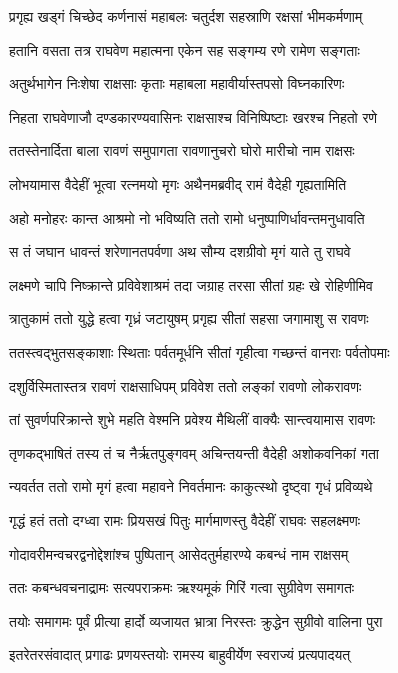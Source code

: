 \twolineshloka
{प्रगृह्य खड्गं चिच्छेद कर्णनासं महाबलः}
{चतुर्दश सहस्राणि रक्षसां भीमकर्मणाम्}

\twolineshloka
{हतानि वसता तत्र राघवेण महात्मना}
{एकेन सह सङ्गम्य रणे रामेण सङ्गताः}

\twolineshloka
{अतुर्थभागेन निःशेषा राक्षसाः कृताः}
{महाबला महावीर्यास्तपसो विघ्नकारिणः}

\twolineshloka
{निहता राघवेणाजौ दण्डकारण्यवासिनः}
{राक्षसाश्च विनिष्पिष्टाः खरश्च निहतो रणे}

\twolineshloka
{ततस्तेनार्दिता बाला रावणं समुपागता}
{रावणानुचरो घोरो मारीचो नाम राक्षसः}

\twolineshloka
{लोभयामास वैदेहीं भूत्वा रत्नमयो मृगः}
{अथैनमब्रवीद् रामं वैदेही गृह्यतामिति}

\twolineshloka
{अहो मनोहरः कान्त आश्रमो नो भविष्यति}
{ततो रामो धनुष्पाणिर्धावन्तमनुधावति}

\twolineshloka
{स तं जघान धावन्तं शरेणानतपर्वणा}
{अथ सौम्य दशग्रीवो मृगं याते तु राघवे}

\twolineshloka
{लक्ष्मणे चापि निष्क्रान्ते प्रविवेशाश्रमं तदा}
{जग्राह तरसा सीतां ग्रहः खे रोहिणीमिव}

\twolineshloka
{त्रातुकामं ततो युद्धे हत्वा गृध्रं जटायुषम्}
{प्रगृह्य सीतां सहसा जगामाशु स रावणः}

\twolineshloka
{ततस्त्वद्भुतसङ्काशाः स्थिताः पर्वतमूर्धनि}
{सीतां गृहीत्वा गच्छन्तं वानराः पर्वतोपमाः}

\twolineshloka
{दशुर्विस्मितास्तत्र रावणं राक्षसाधिपम्}
{प्रविवेश ततो लङ्कां रावणो लोकरावणः}

\twolineshloka
{तां सुवर्णपरिक्रान्ते शुभे महति वेश्मनि}
{प्रवेश्य मैथिलीं वाक्यैः सान्त्वयामास रावणः}

\twolineshloka
{तृणकद्भाषितं तस्य तं च नैर्ऋतपुङ्गवम्}
{अचिन्तयन्ती वैदेही अशोकवनिकां गता}

\twolineshloka
{न्यवर्तत ततो रामो मृगं हत्वा महावने}
{निवर्तमानः काकुत्स्थो दृष्ट्वा गृधं प्रविव्यथे}

\twolineshloka
{गृद्धं हतं ततो दग्ध्वा रामः प्रियसखं पितुः}
{मार्गमाणस्तु वैदेहीं राघवः सहलक्ष्मणः}

\twolineshloka
{गोदावरीमन्वचरद्वनोद्देशांश्च पुष्पितान्}
{आसेदतुर्महारण्ये कबन्धं नाम राक्षसम्}

\twolineshloka
{ततः कबन्धवचनाद्रामः सत्यपराक्रमः}
{ऋश्यमूकं गिरिं गत्वा सुग्रीवेण समागतः}

\twolineshloka
{तयोः समागमः पूर्वं प्रीत्या हार्दो व्यजायत}
{भ्रात्रा निरस्तः क्रुद्धेन सुग्रीवो वालिना पुरा}

\twolineshloka
{इतरेतरसंवादात् प्रगाढः प्रणयस्तयोः}
{रामस्य बाहुवीर्येण स्वराज्यं प्रत्यपादयत्}


